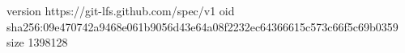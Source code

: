 version https://git-lfs.github.com/spec/v1
oid sha256:09e470742a9468e061b9056d43e64a08f2232ec64366615c573c66f5c69b0359
size 1398128
